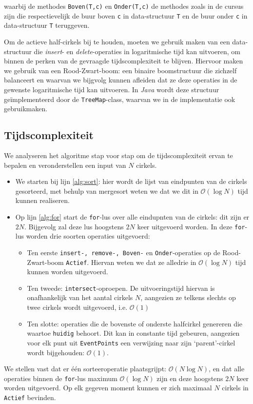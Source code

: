 \documentclass[12pt]{article}
\begin{document}
waarbij de methodes \texttt{Boven(T,c)} en \texttt{Onder(T,c)} de methodes zoals in de cursus zijn die respectievelijk de buur boven \texttt{c} in data-structuur \texttt{T} en de buur onder \texttt{c} in data-structuur \texttt{T} teruggeven.


Om de actieve half-cirkels bij te houden, moeten we gebruik maken van een data-structuur die \textit{insert}- en \textit{delete}-operaties in logaritmische tijd kan uitvoeren, om binnen de perken van de gevraagde tijdscomplexiteit te blijven. Hiervoor maken we gebruik van een Rood-Zwart-boom: een binaire boomstructuur die zichzelf balanceert en waarvan we bijgvolg kunnen afleiden dat ze deze operaties in de gewenste logaritmische tijd kan uitvoeren. In \textit{Java} wordt deze structuur geïmplementeerd door de \texttt{TreeMap}-class, waarvan we in de implementatie ook gebruikmaken.

\subsection{Tijdscomplexiteit}
We analyseren het algoritme stap voor stap om de tijdscomplexiteit ervan te bepalen en veronderstellen een input van $N$ cirkels.
\begin{itemize}
	\item  We starten bij lijn \ref{alg:sort}: hier wordt de lijst van eindpunten van de cirkels gesorteerd, met behulp van mergesort weten we dat we dit in $\mathcal{O}(\log N)$ tijd kunnen realiseren.
	\item Op lijn \ref{alg:for} start de \texttt{for}-lus over alle eindupnten van de cirkels: dit zijn er $2N$. Bijgevolg zal deze lus hoogstens $2N$ keer uitgevoerd worden. In deze \texttt{for}-lus worden drie soorten operaties uitgevoerd:
	\begin{itemize}
		\item Ten eerste \texttt{insert-, remove-, Boven-} en \texttt{Onder}-operaties op de Rood-Zwart-boom \texttt{Actief}. Hiervan weten we dat ze alledrie in $\mathcal{O}(\log N)$ tijd kunnen worden uitgevoerd.
		\item  Ten tweede: \texttt{intersect}-oproepen. De uitvoeringstijd hiervan is onafhankelijk van het aantal cirkels $N$, aangezien ze telkens slechts op twee cirkels wordt uitgevoerd, i.e. $\mathcal{O}(1)$
		\item Ten slotte: operaties die de bovenste of onderste halfcirkel genereren die waartoe \texttt{huidig} behoort. Dit kan in constante tijd gebeuren, aangezien voor elk punt uit \texttt{EventPoints} een verwijzing naar zijn `parent'-cirkel wordt bijgehouden: $\mathcal{O}(1)$.
	\end{itemize}
\end{itemize}
We stellen vast dat er één sorteeroperatie plaatsgrijpt: $\mathcal{O}(N\log N)$, en dat alle operaties binnen de \texttt{for}-lus maximum $\mathcal{O}(\log N)$ zijn en deze hoogstens $2N$ keer worden uitgevoerd. Op elk gegeven moment kunnen er zich maximaal $N$ cirkels in \texttt{Actief} bevinden.
\end{document}
